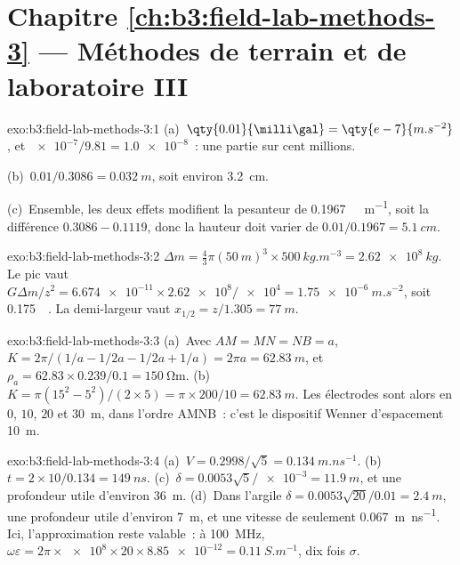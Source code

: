 \section*{Chapitre \ref{ch:b3:field-lab-methods-3} --- Méthodes de terrain et de laboratoire III}

\begin{solution}{exo:b3:field-lab-methods-3:1}
(a)~$\qty{0.01}{\milli\gal} = \qty{e-7}{m.s^{-2}}$, et
$\num{e-7}/\num{9.81} = \num{1.0e-8}$~: une partie sur cent millions.

(b)~$0.01/0.3086 = \qty{0.032}{m}$, soit environ \qty{3.2}{cm}.

(c)~Ensemble, les deux effets modifient la pesanteur de
\qty{0.1967}{\milli\gal.m^{-1}}, soit la différence $0.3086 - 0.1119$, donc
la hauteur doit varier de $0.01/0.1967 = \qty{5.1}{cm}$.
\end{solution}

\begin{solution}{exo:b3:field-lab-methods-3:2}
$\Delta m = \tfrac43\pi(\qty{50}{m})^3\times\qty{500}{kg.m^{-3}} =
\qty{2.62e8}{kg}$. Le pic vaut $G\Delta m/z^2 =
\num{6.674e-11}\times\num{2.62e8}/\num{e4} = \qty{1.75e-6}{m.s^{-2}}$,
soit \qty{0.175}{\milli\gal}. La demi-largeur vaut $x_{1/2} = z/1.305 =
\qty{77}{m}$.
\end{solution}

\begin{solution}{exo:b3:field-lab-methods-3:3}
(a)~Avec $AM = MN = NB = a$, $K = 2\pi/(1/a - 1/2a - 1/2a + 1/a) =
2\pi a = \qty{62.83}{m}$, et $\rho_a = 62.83\times0.239/0.1 =
\qty{150}{\ohm\metre}$. (b)~$K = \pi(15^2 - 5^2)/(2\times5) = \pi\times
200/10 = \qty{62.83}{m}$. Les électrodes sont alors en $0$, $10$, $20$
et \qty{30}{m}, dans l'ordre AMNB~: c'est le dispositif Wenner
d'espacement \qty{10}{m}.
\end{solution}

\begin{solution}{exo:b3:field-lab-methods-3:4}
(a)~$V = 0.2998/\sqrt5 = \qty{0.134}{m.ns^{-1}}$. (b)~$t =
2\times10/0.134 = \qty{149}{ns}$. (c)~$\delta = 0.0053\sqrt5/\num{e-3} =
\qty{11.9}{m}$, et une profondeur utile d'environ \qty{36}{m}. (d)~Dans l'argile
$\delta = 0.0053\sqrt{20}/0.01 = \qty{2.4}{m}$, une profondeur utile
d'environ \qty{7}{m}, et une vitesse de seulement \qty{0.067}{m.ns^{-1}}.
Ici, l'approximation reste valable~: à \qty{100}{MHz},
$\omega\varepsilon = 2\pi\times\num{e8}\times20\times\num{8.85e-12} =
\qty{0.11}{S.m^{-1}}$, dix fois $\sigma$.
\end{solution}


